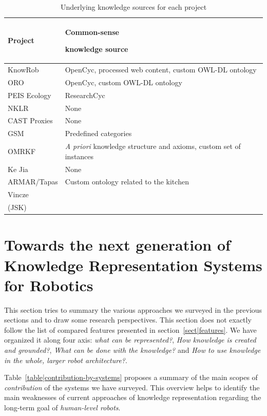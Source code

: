 \documentclass[a4paper, twocolumn]{article}
\begin{document}
\begin{table}
\begin{center}

\begin{tabular}{lp{4cm}}
\toprule
{\bf Project} & {\bf Common-sense \par knowledge source} \\
\midrule
{\sc KnowRob} & {\sc OpenCyc}, processed web content, custom OWL-DL ontology \\
ORO & {\sc OpenCyc}, custom OWL-DL ontology \\
PEIS Ecology & {\sc ResearchCyc} \\
NKLR &  None \\
CAST Proxies &  None \\
GSM &  Predefined categories \\
OMRKF & {\it A priori} knowledge structure and axioms, custom set of instances\\
Ke Jia & None \\
ARMAR/{\sc Tapas} & Custom ontology related to the kitchen\\
Vincze & \\
(JSK) & \\

\bottomrule

\end{tabular}
\end{center}
\caption{Underlying knowledge sources for each project}
\label{table|knowledge-sources}
\end{table}


\section{Towards the next generation of Knowledge Representation Systems for Robotics}
\label{sect|conclusion}

This section tries to summary the various approaches we surveyed in the
previous sections and to draw some research perspectives. This section does not
exactly follow the list of compared features presented in
section~\ref{sect|features}. We have organized it along four axis: \emph{what
can be represented?}, \emph{How knowledge is created and grounded?}, \emph{What
can be done with the knowledge?} and \emph{How to use knowledge in the whole,
larger robot architecture?}.

Table~\ref{table|contribution-by-systems} proposes a summary of the main scopes
of \emph{contribution} of the systems we have surveyed. This overview helps to
identify the main weaknesses of current approaches of knowledge representation
regarding the long-term goal of \emph{human-level robots}.
\end{document}
